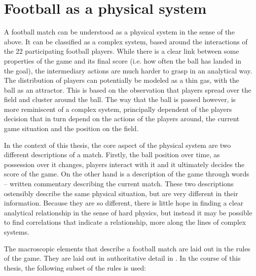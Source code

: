 \documentclass[10pt, a4paper]{UUThesisTemplate}
\begin{document}
\section{Football as a physical system}

A football match can be understood as a physical system in the sense of the above. It can be classified as a complex system, based around the interactions of the 22 participating football players. While there is a clear link between some properties of the game and its final score (i.e. how often the ball has landed in the goal), the intermediary actions are much harder to grasp in an analytical way. The distribution of players can potentially be modeled as a thin gas, with the ball as an attractor. This is based on the observation that players spread over the field and cluster around the ball. The way that the ball is passed however, is more reminiscent of a complex system, principally dependent of the players decision that in turn depend on the actions of the players around, the current game situation and the position on the field.

In the context of this thesis, the core aspect of the physical system are two different descriptions of a match. Firstly, the ball position over time, as possession over it changes, players interact with it and it ultimately decides the score of the game. On the other hand is a description of the game through words – written commentary describing the current match. These two descriptions ostensibly describe the same physical situation, but are very different in their information. Because they are so different, there is little hope in finding a clear analytical relationship in the sense of hard physics, but instead it may be possible to find correlations that indicate a relationship, more along the lines of complex systems.

The macroscopic elements that describe a football match are laid out in the rules of the game. They are laid out in authoritative detail in \cite{footballrules}.  In the course of this thesis, the following subset of the rules is used:
\end{document}
